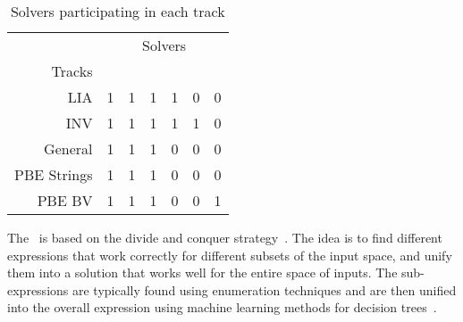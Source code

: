 \begin{table}[b]
	{\small{
			\begin{center}
			\end{center}
			\caption{Submitted Solvers }
			\label{tbl:solvers-authors}
		}}
\end{table}


\begin{table}[t]
	\begin{center}
		\begin{tabular}{r||rrrrrr}
			& \multicolumn{6}{c}{Solvers} \\
			Tracks & \rot{\eusolvernew} & \rot{\cvcnew} & \rot{\euphony} & \rot{\dryd} & \rot{\lig} & \rot{\ethree} \\ \hline \hline
			LIA         & 1 & 1 & 1 & 1 & 0 & 0 \\
			INV         & 1 & 1 & 1 & 1 & 1 & 0\\
			General     & 1 & 1 & 1 & 0 & 0 & 0\\ 
			PBE Strings & 1 & 1 & 1 & 0 & 0 & 0\\ 
			PBE BV      & 1 & 1 & 1 & 0 & 0 & 1
		\end{tabular}
	\end{center}
	\caption{Solvers participating in each track}
	\label{tbl:solvers-in-tracks}
\end{table}


 The \eusolvernew\ is based on the divide and conquer strategy~\cite{AlurCAV15}. The idea is to find different expressions that work correctly for different subsets of the input space, and unify them into a solution that works well for the entire space of inputs. The sub-expressions are typically found using enumeration techniques  and are then unified into the overall expression using machine learning methods for decision trees~\cite{AlurRU17}.

